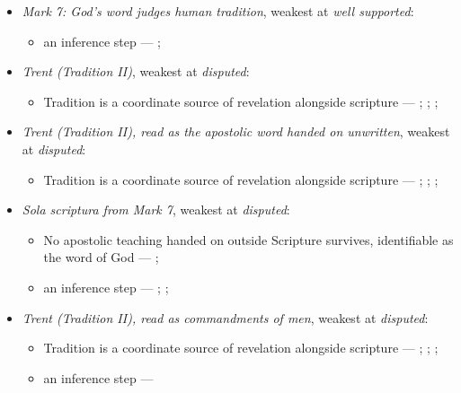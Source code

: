\documentclass[11pt]{article}
\begin{document}
\begin{itemize}
\item \emph{Mark 7: God's word judges human tradition}, weakest at \emph{well supported}:
\begin{itemize}
\item an inference step --- \cite[Vatican II (1965), Dei Verbum 10]{tanner-decrees-1990}; \cite[IV.x.23]{calvin-institutes-1960}
\end{itemize}
\item \emph{Trent (Tradition II)}, weakest at \emph{disputed}:
\begin{itemize}
\item Tradition is a coordinate source of revelation alongside scripture --- \cite[Trent, Session IV (1546), Decree on Sacred Books and Traditions]{tanner-decrees-1990}; \cite{mathison-shape-sola-scriptura-2001}; \cite{geiselmann-meaning-of-tradition-1966}; \cite{congar-tradition-and-traditions-1966}
\end{itemize}
\item \emph{Trent (Tradition II), read as the apostolic word handed on unwritten}, weakest at \emph{disputed}:
\begin{itemize}
\item Tradition is a coordinate source of revelation alongside scripture --- \cite[Trent, Session IV (1546), Decree on Sacred Books and Traditions]{tanner-decrees-1990}; \cite{mathison-shape-sola-scriptura-2001}; \cite{geiselmann-meaning-of-tradition-1966}; \cite{congar-tradition-and-traditions-1966}
\end{itemize}
\item \emph{Sola scriptura from Mark 7}, weakest at \emph{disputed}:
\begin{itemize}
\item No apostolic teaching handed on outside Scripture survives, identifiable as the word of God --- \cite[506]{whitaker-disputation-1849}; \cite[I.6]{westminster-confession-1647}
\item an inference step --- \cite{geiselmann-meaning-of-tradition-1966}; \cite[Vatican I (1870), Pastor Aeternus, ch. 4]{tanner-decrees-1990}; \cite{florovsky-bible-church-tradition-1972}
\end{itemize}
\item \emph{Trent (Tradition II), read as commandments of men}, weakest at \emph{disputed}:
\begin{itemize}
\item Tradition is a coordinate source of revelation alongside scripture --- \cite[Trent, Session IV (1546), Decree on Sacred Books and Traditions]{tanner-decrees-1990}; \cite{mathison-shape-sola-scriptura-2001}; \cite{geiselmann-meaning-of-tradition-1966}; \cite{congar-tradition-and-traditions-1966}
\item an inference step --- \cite[IV.x.23]{calvin-institutes-1960}
\end{itemize}
\end{itemize}
\end{document}
